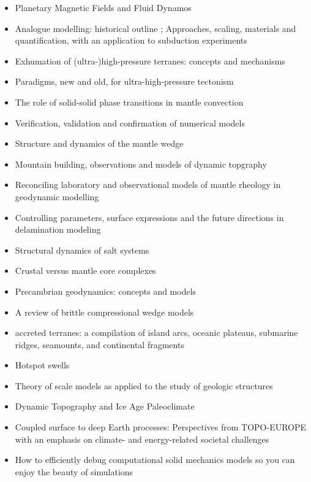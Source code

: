 \begin{itemize}
\item Planetary Magnetic Fields and Fluid Dynamos \cite{jone11}
\item Analogue modelling: historical outline \cite{koyi97}; Approaches, scaling, materials and quantification, with an application to subduction experiments \cite{scst16}
\item Exhumation of (ultra-)high-pressure terranes: concepts and mechanisms \cite{warr13}
\item Paradigms, new and old, for ultra-high-pressure tectonism \cite{hage13}
\item The role of solid-solid phase transitions in mantle convection \cite{fada17}
\item Verification, validation and confirmation of numerical models \cite{orsb94}
\item Structure and dynamics of the mantle wedge \cite{vank03}
\item Mountain building, observations and models of dynamic topgraphy \cite{flgm13,fabc13}
\item Reconciling laboratory and observational models of mantle rheology in geodynamic modelling \cite{king16}
\item Controlling parameters, surface expressions and the future directions in delamination modeling \cite{goue18}
\item Structural dynamics of salt systems \cite{javs94}
\item Crustal versus mantle core complexes \cite{brst18}
\item Precambrian geodynamics: concepts and models \cite{gery14}
\item A review of brittle compressional wedge models \cite{buit12}
\item accreted terranes: a compilation of island arcs, oceanic
      plateaus, submarine ridges, seamounts, and continental fragments \cite{tebu14}
\item Hotspot swells \cite{kiad14}
\item Theory of scale models as applied to the study of geologic structures \cite{hubb37}
\item Dynamic Topography and Ice Age Paleoclimate \cite{miac20}
\item Coupled surface to deep Earth processes: Perspectives from TOPO-EUROPE
with an emphasis on climate- and energy-related societal challenges \cite{clsk23}
\item How to efficiently debug computational solid mechanics models so
you can enjoy the beauty of simulations \cite{copb23}
\end{itemize}





